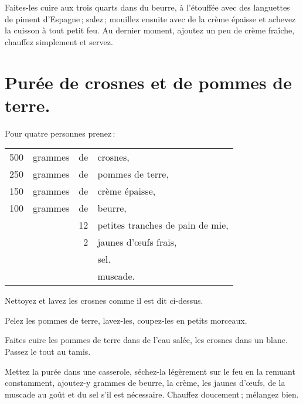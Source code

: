 Faites-les cuire aux trois quarts dans du beurre, à l'étouffée avec des languettes
de piment d'Espagne ; salez ; mouillez ensuite avec de la crème épaisse et achevez
la cuisson à tout petit feu. Au dernier moment, ajoutez un peu de crème fraîche,
chauffez simplement et servez.

\section*{\centering Purée de crosnes et de pommes de terre.}
{}

Pour quatre personnes prenez :

\footnotesize
\begin{longtable}{rrrp{16em}}
    500 & grammes & de & crosnes,                                                                         \\
    250 & grammes & de & pommes de terre,                                                                 \\
    150 & grammes & de & crème épaisse,                                                                   \\
    100 & grammes & de & beurre,                                                                          \\
        &         & 12 & petites tranches de pain de mie,                                                 \\
        &         &  2 & jaunes d'œufs frais,                                                             \\
        &         &    & sel.                                                                             \\
        &         &    & muscade.                                                                         \\
\end{longtable}
\normalsize

Nettoyez et lavez les crosnes comme il est dit ci-dessus.

Pelez les pommes de terre, lavez-les, coupez-les en petits morceaux.

Faites cuire les pommes de terre dans de l'eau salée, les crosnes dans un
blanc. Passez le tout au tamis.

Mettez la purée dans une casserole, séchez-la légèrement sur le feu en la
remuant constamment, ajoutez-y {\mmm} grammes de beurre, la crème, les
jaunes d'œufs, de la muscade au goût et du sel s'il est nécessaire. Chauffez
doucement ; mélangez bien.

